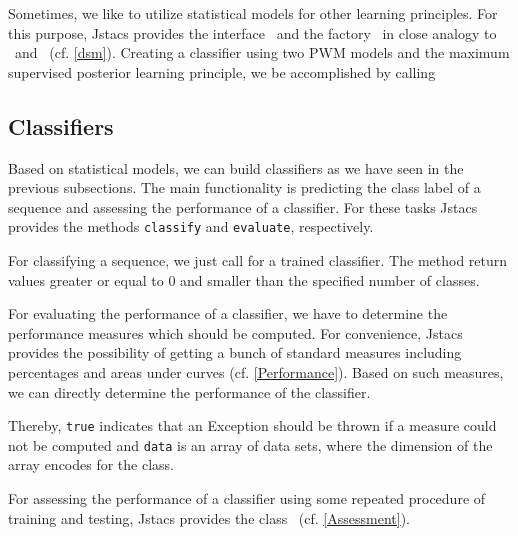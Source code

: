 Sometimes, we like to utilize statistical models for other learning principles. For this purpose, Jstacs provides the interface \DiffSM~and the factory \DiffSMFactory~in close analogy to \TrainSM~and \TrainSMFactory~(cf. \ref{dsm}). Creating a classifier using two PWM models and the maximum supervised posterior learning principle, we be accomplished by calling
\renewcommand{\codefile}{recipes/CreateMSPClassifier.java}
\setcounter{off}{37}

\subsection{Classifiers}

\renewcommand{\codefile}{recipes/TrainClassifier.java}
Based on statistical models, we can build classifiers as we have seen in the previous subsections. The main functionality is predicting the class label of a sequence and assessing the performance of a classifier. For these tasks Jstacs provides the methods \lstinline+classify+ and \lstinline+evaluate+, respectively.

For classifying a sequence, we just call
\setcounter{off}{53}
for a trained classifier. The method return values greater or equal to 0 and smaller than the specified number of classes. 

For evaluating the performance of a classifier, we have to determine the performance measures which should be computed. For convenience, Jstacs provides the possibility of getting a bunch of standard measures including percentages and areas under curves (cf. \ref{Performance}). Based on such measures, we can directly determine the performance of the classifier.
\addtocounter{off}{6}
Thereby, \lstinline+true+ indicates that an Exception should be thrown if a measure could not be computed and \lstinline+data+ is an array of data sets, where the dimension of the array encodes for the class.

For assessing the performance of a classifier using some repeated procedure of training and testing, Jstacs provides the class \ClassifierAssessment~(cf. \ref{Assessment}).

\renewcommand{\codefile}{\defaultcodefile}
\setcounter{off}{1}